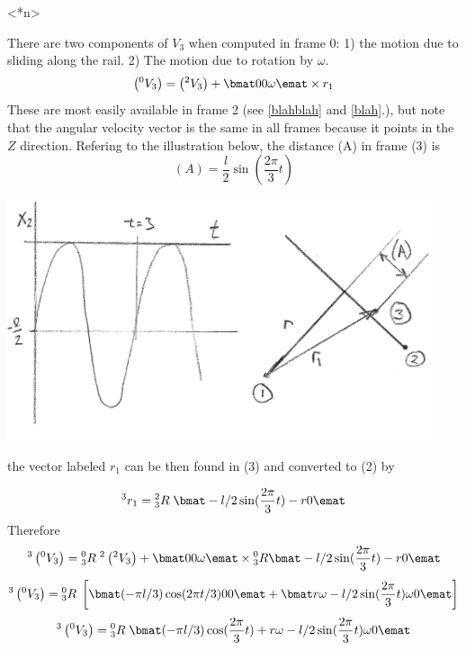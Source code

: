 <*n>
\begin{solution}

There are two components of $V_3$ when computed in frame $0$:    1) the motion due to sliding along the rail. 2) The motion due to rotation by $\omega$.
\[
\left(^0V_3\right) = \left(^2V_3\right) + \bmat 0\\0\\\omega\emat\times r_1
\]
These are most easily available in frame 2 (see \ref{blahblah} and \ref{blah}.), but note that the angular velocity vector is the same in all frames because it points in the $Z$ direction.   Refering to the illustration below, the distance (A) in frame (3) is
\[
(A) = \frac{l}{2}\sin(\frac{2\pi}{3}t)
\]

\includegraphics[width=5.0in]{00912.png}

the vector labeled $r_1$ can be then found in (3) and converted to (2)  by

\[
^3r_1 = {^2_3R}\;\bmat -l/2 \sin(\frac{2\pi}{3}t) \\-r \\ 0 \emat
\]
Therefore
\[
^3\left(^0V_3\right) = {^0_3R}\; ^2\left(^2V_3\right) +  \bmat 0\\0\\\omega\emat\times {^0_3R}\bmat -l/2 \sin(\frac{2\pi}{3}t) \\-r\\0 \emat
\]
\vspace{0.25in}
\[
^3\left(^0V_3\right) = {^0_3R}\; \left [ \bmat (-\pi l/3)\cos(2\pi t/3)\\0\\0\emat +  \bmat r\omega \\ -l/2 \sin(\frac{2\pi}{3}t)\omega \\0 \emat\right]
\]
\[
^3\left(^0V_3\right) = {^0_3R}\; \bmat (-\pi l/3)\cos(\frac{2\pi}{3}t)+ r\omega \\ -l/2 \sin(\frac{2\pi}{3}t)\omega \\0 \emat
\]

\end{solution}


